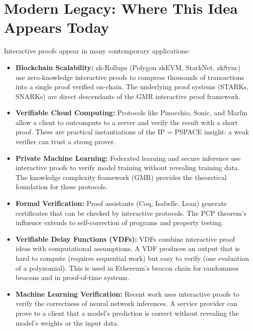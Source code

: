 \section{Modern Legacy: Where This Idea Appears Today}
\label{sec:ip:legacy}

Interactive proofs appear in many contemporary applications:

\begin{itemize}
\item \textbf{Blockchain Scalability:} zk-Rollups (Polygon zkEVM, StarkNet, zkSync) use zero-knowledge interactive proofs to compress thousands of transactions into a single proof verified on-chain. The underlying proof systems (STARKs, SNARKs) are direct descendants of the GMR interactive proof framework.

\item \textbf{Verifiable Cloud Computing:} Protocols like Pinocchio, Sonic, and Marlin allow a client to outcompute to a server and verify the result with a short proof. These are practical instantiations of the IP = PSPACE insight: a weak verifier can trust a strong prover.

\item \textbf{Private Machine Learning:} Federated learning and secure inference use interactive proofs to verify model training without revealing training data. The knowledge complexity framework (GMR) provides the theoretical foundation for these protocols.

\item \textbf{Formal Verification:} Proof assistants (Coq, Isabelle, Lean) generate certificates that can be checked by interactive protocols. The PCP theorem's influence extends to self-correction of programs and property testing.

\item \textbf{Verifiable Delay Functions (VDFs):} VDFs combine interactive proof ideas with computational assumptions. A VDF produces an output that is hard to compute (requires sequential work) but easy to verify (one evaluation of a polynomial). This is used in Ethereum's beacon chain for randomness beacons and in proof-of-time systems.

\item \textbf{Machine Learning Verification:} Recent work uses interactive proofs to verify the correctness of neural network inferences. A service provider can prove to a client that a model's prediction is correct without revealing the model's weights or the input data.
\end{itemize}

